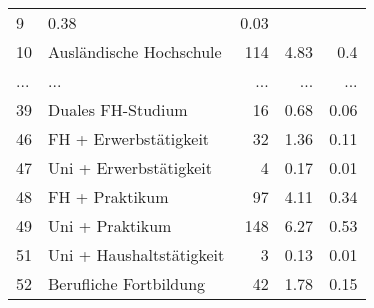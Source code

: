 \begin{longtable}{lXrrr}
          \num{9} &
          \num[round-mode=places,round-precision=2]{0.38} &
          \num[round-mode=places,round-precision=2]{0.03} \\
        10 & \multicolumn{1}{X}{Ausländische Hochschule} & %
          \num{114} &
          \num[round-mode=places,round-precision=2]{4.83} &
          \num[round-mode=places,round-precision=2]{0.4} \\
       ... & ... & ... & ... & ... \\
        39 & \multicolumn{1}{X}{Duales FH-Studium} & %
          \num{16} &
          \num[round-mode=places,round-precision=2]{0.68} &
          \num[round-mode=places,round-precision=2]{0.06} \\

        46 & \multicolumn{1}{X}{FH + Erwerbstätigkeit} & %
          \num{32} &
          \num[round-mode=places,round-precision=2]{1.36} &
          \num[round-mode=places,round-precision=2]{0.11} \\

        47 & \multicolumn{1}{X}{Uni + Erwerbstätigkeit} & %
          \num{4} &
          \num[round-mode=places,round-precision=2]{0.17} &
          \num[round-mode=places,round-precision=2]{0.01} \\

        48 & \multicolumn{1}{X}{FH + Praktikum} & %
          \num{97} &
          \num[round-mode=places,round-precision=2]{4.11} &
          \num[round-mode=places,round-precision=2]{0.34} \\

        49 & \multicolumn{1}{X}{Uni + Praktikum} & %
          \num{148} &
          \num[round-mode=places,round-precision=2]{6.27} &
          \num[round-mode=places,round-precision=2]{0.53} \\

        51 & \multicolumn{1}{X}{Uni + Haushaltstätigkeit} & %
          \num{3} &
          \num[round-mode=places,round-precision=2]{0.13} &
          \num[round-mode=places,round-precision=2]{0.01} \\

        52 & \multicolumn{1}{X}{Berufliche Fortbildung} & %
          \num{42} &
          \num[round-mode=places,round-precision=2]{1.78} &
          \num[round-mode=places,round-precision=2]{0.15} \\


\end{longtable}
